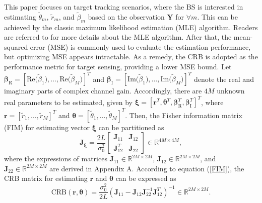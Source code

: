 \documentclass[10pt,journal,twocolumn]{IEEEtran}
\begin{document}
This paper focuses on target tracking scenarios, where the BS is interested in estimating $\tilde \theta_m$, $\tilde r_m$, and $\tilde \beta_m$ based on the observation $\mathbf{Y}$ for $\forall m$. This can be achieved by the classic maximum likelihood estimation (MLE) algorithm. Readers are referred to \cite{10050406} for more details about the MLE algorithm. After that, the mean-squared error (MSE) is commonly used to evaluate the estimation performance, but optimizing MSE appears intractable. As a remedy, the CRB is adopted as the performance metric for target sensing, providing a lower MSE bound.  
Let $\boldsymbol{\beta}_\text{R}=\left[\text{Re}\big(\tilde\beta_1\big),\dots,\text{Re}\big(\tilde\beta_M\big)\right]^T$ and $\boldsymbol{\beta}_\text{I}=\left[\text{Im}\big(\tilde\beta_1\big),\dots,\text{Im}\big(\tilde\beta_M\big)\right]^T$ denote the real and imaginary parts of complex channel gain. Accordingly, there are   $4M$ unknown real parameters to be estimated, given by $\boldsymbol{\xi}=\left[\mathbf{r}^T,\boldsymbol{\theta}^T,\boldsymbol{\beta}^T_\text{R},\boldsymbol{\beta}^T_\text{I}\right]^T$, where $\mathbf{r}=\left[\tilde r_1,\dots,\tilde r_M\right]^T$ and $\boldsymbol{\theta}=\left[\tilde \theta_1,\dots,\tilde \theta_M\right]^T$. Then, the Fisher information matrix (FIM) for estimating vector $\bm{\xi}$ can be partitioned as
\begin{equation}
\mathbf{J}_{\bm{\xi}}= \frac{2L}{\sigma^2_0}\begin{bmatrix} \mathbf{J}_{11} & \mathbf{J}_{12} \\ \mathbf{J}^T_{12} & \mathbf{J}_{22} \end{bmatrix}\in\mathbb{R}^{4M\times 4M},
\label{FIM}
\end{equation}
where the expressions of matrices $\mathbf{J}_{11}\in\mathbb{R}^{2M\times 2M}$, $\mathbf{J}_{12}\in\mathbb{R}^{2M\times 2M}$, and $\mathbf{J}_{22}\in\mathbb{R}^{2M\times 2M}$ are derived in Appendix A. According to equation (\ref{FIM}), the CRB matrix for estimating $\mathbf{r}$ and $\bm{\theta}$ can be expressed as 
\begin{equation}
\text{CRB}\left(\mathbf{r},\bm{\theta}\right) = \frac{\sigma^2_0}{2L}\left(\mathbf{J}_{11}-\mathbf{J}_{12}\mathbf{J}^{-1}_{22}\mathbf{J}^T_{12}\right)^{-1}\in\mathbb{R}^{2M\times 2M}.\label{CRB}
\end{equation}
\end{document}
